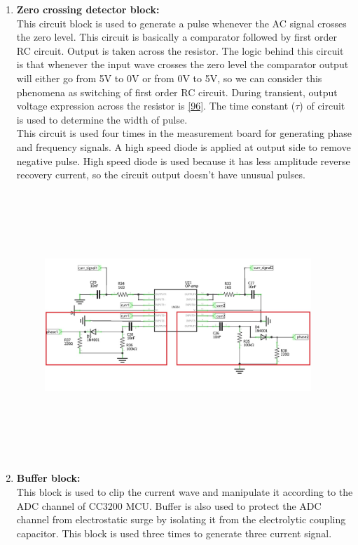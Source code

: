 \documentclass[a4paper,12pt,oneside]{book}
\begin{document}
\begin{appendices}
\begin{enumerate}
\begin{figure}[h]
	\end{figure}
	\item \textbf{Zero crossing detector block:}\\
	This circuit block is used to generate a pulse whenever the AC signal crosses the zero level. This circuit is basically a comparator followed by first order RC circuit. Output is taken across the resistor. The logic behind this circuit is that whenever the input wave crosses the zero level the comparator output will either go from 5V to 0V or from 0V to 5V, so we can consider this phenomena as switching of first order RC circuit. During transient, output voltage expression across the resistor is \autoref{96}. The time constant ($\tau$) of circuit is used to determine the width of pulse.\\
	\hspace{1cm}This circuit is used four times in the measurement board for generating phase and frequency signals. A high speed diode is applied at output side to remove negative pulse. High speed diode is used because it has less amplitude reverse recovery current, so the circuit output doesn't have unusual pulses.
	\begin{figure}[h]
		\includegraphics[width=380px,height=380px]{zcdblock}
	\end{figure}
	\item \textbf{Buffer block:} \\
	This block is used to clip the current wave and manipulate it according to the ADC channel of CC3200 MCU. Buffer is also used to protect the ADC channel from electrostatic surge by isolating it from the electrolytic coupling capacitor. This block is used three times to generate three current signal.

\end{enumerate}
\end{appendices}
\end{document}
